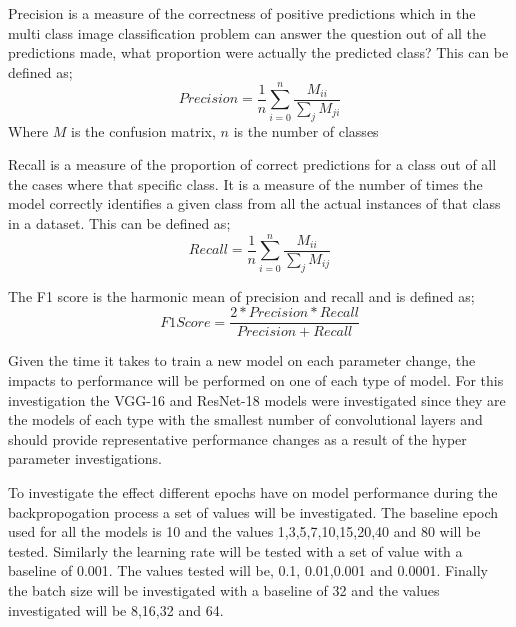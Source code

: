 \documentclass[10pt,twocolumn,letterpaper]{article}
\begin{document}
Precision is a measure of the correctness of positive predictions which in the multi class 
image classification problem can answer the question out of all the predictions made, what 
proportion were actually the predicted class? This can be defined as;
\begin{equation}
   Precision = \dfrac{1}{n}\sum_{i=0}^{n}\dfrac{M_{ii}}{\sum_{j}^{}M_{ji}}
\end{equation}
Where $M$ is the confusion matrix, $n$ is the number of classes

Recall is a measure of the proportion of correct predictions for a class out of all the cases where 
that specific class. It is a measure of the number of times the model correctly identifies 
a given class from all the actual instances of that class in a dataset. This can be defined as;
\begin{equation}
   Recall = \dfrac{1}{n}\sum_{i=0}^{n}\dfrac{M_{ii}}{\sum_{j}^{}M_{ij}}
\end{equation}

The F1 score is the harmonic mean of precision and recall and is defined as;
\begin{equation}
   F1 Score = \dfrac{2*Precision*Recall}{Precision+Recall}
\end{equation}

Given the time it takes to train a new model on each parameter change, the impacts to performance 
will be performed on one of each type of model. For this investigation the VGG-16 and ResNet-18
models were investigated since they are the models of each type with the smallest number 
of convolutional layers and should provide representative performance changes as a result 
of the hyper parameter investigations.

To investigate the effect different epochs have on model performance during the backpropogation
process a set of values will be investigated. The baseline epoch used for all the models 
is 10 and the values 1,3,5,7,10,15,20,40 and 80 will be tested. Similarly the learning rate 
will be tested with a set of value with a baseline of 0.001. The values tested will be, 0.1,
0.01,0.001 and 0.0001. Finally the batch size will be investigated with a baseline of 32 
and the values investigated will be 8,16,32 and 64.
\end{document}
